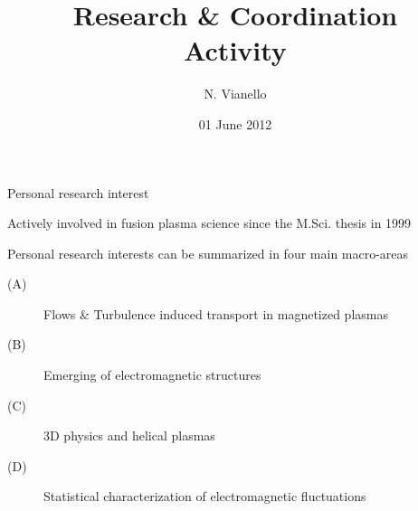 \documentclass[t,10pt]{beamer}
\title{Research \& Coordination  \\
Activity}
\author{N. Vianello }
\date{01 June 2012}
\begin{document}
\begin{titleframe}
\end{titleframe}

\begin{frame}{Personal research interest}
\begin{itemize}
{\large\item Actively involved in fusion plasma science since the
M.Sci. thesis in 1999
\item Personal research interests can be summarized in four main
  macro-areas
\begin{description}
\item[(A)] \textcolor{taorange}{Flows \& Turbulence induced transport in magnetized plasmas}
\item[(B)]\textcolor{ta3chameleon}{Emerging of electromagnetic structures}
\item[(C)] \textcolor{tascarletred}{3D physics and helical plasmas}
\item[(D)] \textcolor{ta3skyblue}{Statistical characterization of
    electromagnetic fluctuations}
\end{description}
}\end{itemize}
\end{frame}
\end{document}
